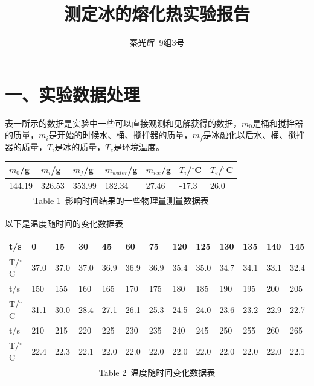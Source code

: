 \documentclass[a4paper,10pt,notitlepage]{report}
\begin{document}
\title{测定冰的熔化热实验报告}
\author{秦光辉\ 9组3号}
\maketitle

\section*{一、实验数据处理}

	表一所示的数据是实验中一些可以直接观测和见解获得的数据，$m_0$是桶和搅拌器的质量，$m_i$是开始的时候水、桶、搅拌器的质量，$m_f$是冰融化以后水、桶、搅拌器的质量，$T_i$是冰的质量，$T_e$是环境温度。
	
\begin{table}[htbp]
\centering
	\begin{tabular}{|l|l|l|l|l|l|l|}
	
		\hline
		$m_0$/g & $m_i$/g & $m_f$/g & $m_{water}$/g & $m_{ice}$/g & $T_i$/$^{\circ}$C & $T_e$/$^{\circ}$C \\
		\hline
		144.19 & 326.53 & 353.99 & 182.34 & 27.46 & -17.3 & 26.0 \\
		\hline
		\multicolumn{7}{c}{\scriptsize Table 1\ 影响时间结果的一些物理量测量数据表} \\

	\end{tabular}
\end{table}

	以下是温度随时间的变化数据表
	
\begin{table}[htbp]
\centering
	\begin{tabular}{|l|l|l|l|l|l|l|l|l|l|l|l|l|}
	
		\hline
		t/s & 0 & 15 & 30 & 45 & 60 & 75 & 120 & 125 & 130 & 135 & 140 & 145 \\
		\hline
		T/$^{\circ}$C & 37.0 & 37.0 & 37.0 & 36.9 & 36.9 & 36.9 & 35.4 & 35.0 & 34.7 & 34.1 & 33.1 & 32.4 \\
		\hline
		\hline
		t/s & 150 & 155 & 160 & 165 & 170 & 175 & 180 & 185 & 190 & 195 & 200 & 205 \\
		\hline
		T/$^{\circ}$C & 31.1 & 30.0 & 28.4 & 27.1 & 26.1 & 25.3 & 24.5 & 24.0 & 23.6 & 23.2 & 22.9 & 22.7 \\
		\hline
		\hline
		t/s & 210 & 215 & 220 & 225 & 230 & 235 & 240 & 245 & 250 & 255 & 260 & 265 \\
		\hline
		T/$^{\circ}$C & 22.4 & 22.3 & 22.1 & 22.0 & 22.0 & 22.0 & 22.0 & 22.0 & 22.0 & 22.0 & 22.0 & 22.1 \\
		\hline
		\multicolumn{13}{c}{\scriptsize Table 2\ 温度随时间变化数据表} \\

	\end{tabular}
\end{table}
\end{document}
